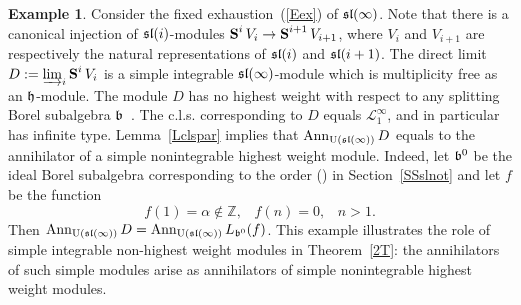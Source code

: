 \documentclass[10pt]{amsart}\oddsidemargin -1mm \evensidemargin -1mm \topmargin -15mm\headheight5mm \headsep 3.5mm \textheight 245mm\textwidth 170mm %
\theoremstyle{definition}\newtheorem{theorem}{Theorem}[section]\newtheorem{lemma}[theorem]{Lemma}\newtheorem{remark}[theorem]{Remark}\newtheorem{proposition}[theorem]{Proposition}\newtheorem{corollary}[theorem]{Corollary}\newtheorem{definition}[theorem]{Definition}\newtheorem{Ex}[theorem]{Example}
\begin{document}
\begin{Ex} Consider the fixed exhaustion~(\ref{Eex}) of $\frak{sl}(\infty)$. Note that there is a canonical injection of $\frak{sl}(i)$-modules $\operatorname{\mathbf{S}}^iV_i\to \operatorname{\mathbf{S}}^{i+1}V_{i+1}$, where $V_i$ and $V_{i+1}$ are respectively the natural representations of $\frak{sl}(i)$ and $\frak{sl}(i+1)$. The direct limit $D:=\varinjlim_i \operatorname{\mathbf{S}}^iV_i$ is a simple integrable $\frak{sl}(\infty)$-module which is multiplicity free as an $\frak h$-module. The module $D$ has no highest weight with respect to any splitting Borel subalgebra $\frak b$~\cite{DP}. The c.l.s. corresponding to $D$ equals $\mathcal L_1^{\infty}$, and in particular has infinite type. Lemma~\ref{Lclspar} implies that $\operatorname{\mathrm{Ann}}_{\operatorname{\mathrm{U}}(\frak{sl}(\infty))}D$ equals to the annihilator of a simple nonintegrable highest weight module. Indeed, let $\frak b^0$ be the ideal Borel subalgebra corresponding to the order () in Section~\ref{SSslnot} and let $f$ be the function $$f(1)=\alpha\notin\mathbb Z, \hspace{10pt}f(n)=0,\hspace{10pt} n>1.$$Then $\operatorname{\mathrm{Ann}}_{\operatorname{\mathrm{U}}(\frak{sl}(\infty))}D=\operatorname{\mathrm{Ann}}_{\operatorname{\mathrm{U}}(\frak{sl}(\infty))} L_{\frak b^0}(f)$. This example illustrates the role of simple integrable non-highest weight modules in Theorem~\ref{2T}: the annihilators of such simple modules arise as annihilators of simple nonintegrable highest weight modules.\end{Ex}
\end{document}
